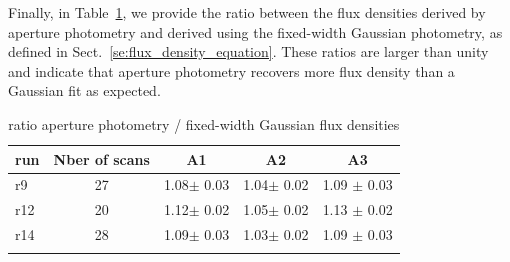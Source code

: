 



Finally, in Table~\ref{tab:ratio}, we provide the ratio between the
flux densities derived by aperture photometry
and derived using the fixed-width Gaussian photometry, as defined in
Sect.~\ref{se:flux_density_equation}.
These ratios are larger than unity and indicate that aperture
photometry recovers more flux density than a Gaussian fit as
expected.




\begin{table}[!htbp]
\caption{ratio aperture photometry / fixed-width Gaussian flux densities   }
\label{tab:ratio}
\centering
\begin{tabular}{l| c | c c c }
\hline\hline
\noalign{\smallskip}
run     & Nber of scans  &  A1    &    A2   &  A3    \\
\hline
r9    & 27  &  1.08$\pm$ 0.03    &  1.04$\pm$ 0.02 & 1.09 $\pm$ 0.03     \\
r12   & 20  &  1.12$\pm$ 0.02    &  1.05$\pm$ 0.02 & 1.13 $\pm$ 0.02     \\
r14   & 28  &  1.09$\pm$ 0.03    &  1.03$\pm$ 0.02 & 1.09 $\pm$ 0.03     \\
\noalign{\smallskip}
\hline
\end{tabular}
\end{table}

